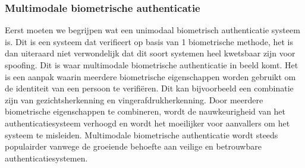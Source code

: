 \subsubsection{Multimodale biometrische authenticatie}%
\label{subsubsec:multimodale-biometrische-authenticatie}
Eerst moeten we begrijpen wat een unimodaal biometrisch authenticatie systeem is. Dit is een systeem dat verifieert op basis van 1 biometrische methode, het is dan uiteraard niet verwondelijk dat dit soort systemen heel kwetsbaar zijn voor spoofing.
\newline
\newline
Dit is waar multimodale biometrische authenticatie in beeld komt. Het is een aanpak waarin meerdere biometrische eigenschappen worden gebruikt om de identiteit van een persoon te verifiëren. Dit kan bijvoorbeeld een combinatie zijn van gezichtsherkenning en vingerafdrukherkenning. Door meerdere biometrische eigenschappen te combineren, wordt de nauwkeurigheid van het authenticatiesysteem verhoogd en wordt het moeilijker voor aanvallers om het systeem te misleiden. Multimodale biometrische authenticatie wordt steeds populairder vanwege de groeiende behoefte aan veilige en betrouwbare authenticatiesystemen.

